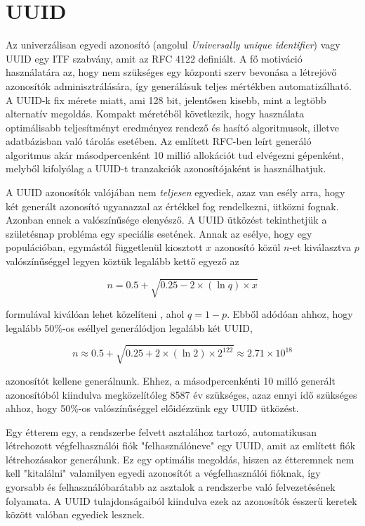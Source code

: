 \section{UUID}

Az univerzálisan egyedi azonosító (angolul \emph{Universally unique identifier}) vagy UUID egy ITF szabvány, amit az RFC 4122 definiált. A fő motiváció használatára az, hogy nem szükséges egy központi szerv bevonása a létrejövő azonosítók adminisztrálására, így generálásuk teljes mértékben automatizálható. A UUID-k fix mérete miatt, ami 128 bit, jelentősen kisebb, mint a legtöbb alternatív megoldás. Kompakt méretéből következik, hogy használata optimálisabb teljesítményt eredményez rendező és hasító algoritmusok, illetve adatbázisban való tárolás esetében. Az említett RFC-ben leírt generáló algoritmus akár másodpercenként 10 millió allokációt tud elvégezni gépenként, melyből kifolyólag a UUID-t tranzakciók azonosítójaként is használhatjuk. \par

A UUID azonosítók valójában nem \emph{teljesen} egyediek, azaz van esély arra, hogy két generált azonosító ugyanazzal az értékkel fog rendelkezni, ütközni fognak. Azonban ennek a valószínűsége elenyésző. A UUID ütközést tekinthetjük a születésnap probléma egy speciális esetének. Annak az esélye, hogy egy populációban, egymástól függetlenül kiosztott $x$ azonosító közül $n$-et kiválasztva $p$ valószínűséggel legyen köztük legalább kettő egyező az

\begin{equation*}
	n = 0.5 + \sqrt{0.25 - 2\times(\ln q)\times x}
\end{equation*}

formulával kiválóan lehet közelíteni \cite{mathis1991generalized}, ahol $q = 1 - p$. Ebből adódóan ahhoz, hogy legalább 50\%-os eséllyel generálódjon legalább két UUID,

\begin{equation*}
	n \approx 0.5 + \sqrt{0.25 + 2\times(\ln 2)\times2^{122}} \approx 2.71 \times 10^{18}
\end{equation*}

azonosítót kellene generálnunk. Ehhez, a másodpercenkénti 10 milló generált azonosítóból kiindulva megközelítóleg 8587 év szükséges, azaz ennyi idő szükséges ahhoz, hogy 50\%-os valószínűséggel előidézzünk egy UUID ütközést. \par

Egy étterem egy, a rendszerbe felvett asztalához tartozó, automatikusan létrehozott végfelhasználói fiók "felhasználóneve" egy UUID, amit az említett fiók létrehozásakor generálunk. Ez egy optimális megoldás, hiszen az étteremnek nem kell "kitalálni" valamilyen egyedi azonosítót a végfelhasználói fióknak, így gyorsabb és felhasználóbarátabb az asztalok a rendszerbe való felvezetésének folyamata. A UUID tulajdonságaiból kiindulva ezek az azonosítók ésszerű keretek között valóban egyediek lesznek.